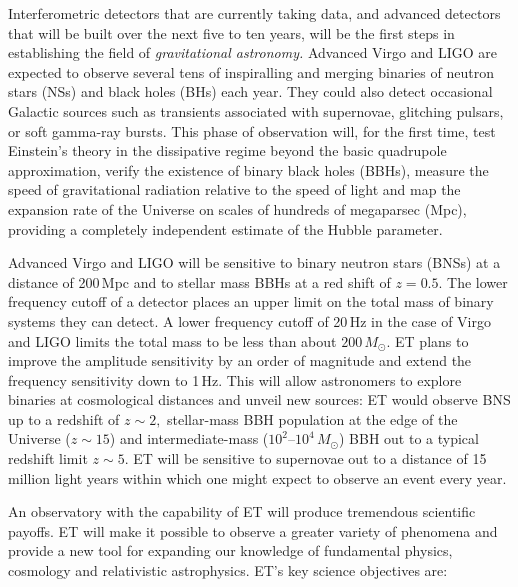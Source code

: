 Interferometric detectors that are currently
taking data, and advanced detectors that will be built over the next 
five to ten years, will be the first steps in establishing the field of 
{\em gravitational astronomy.} Advanced Virgo and LIGO are expected 
to observe several tens of inspiralling and merging binaries of 
neutron stars (NSs) and black holes (BHs) each year. They could also detect 
occasional Galactic sources such as transients associated with supernovae, 
glitching pulsars, or soft gamma-ray bursts.
This phase of observation will, for the first time, test 
Einstein's theory in the dissipative regime beyond the basic quadrupole 
approximation, verify the existence of binary black holes (BBHs), measure the 
speed of gravitational radiation relative to the speed of light and map 
the expansion rate of the Universe on scales of hundreds of megaparsec (Mpc), 
providing a completely independent estimate of the Hubble parameter. 

Advanced Virgo and LIGO will be sensitive to binary neutron stars (BNSs)
at a distance of 200\,Mpc and to stellar mass BBHs
at a red shift of $z=0.5.$ The lower frequency cutoff of a detector 
places an upper limit on the total mass of binary systems they can 
detect. A lower frequency cutoff of 20\,Hz in the case of Virgo and LIGO
limits the total mass to be less than about $200\,M_\odot.$ 
ET plans to improve the amplitude sensitivity by an order of magnitude 
and extend the frequency sensitivity down to 1\,Hz. This will allow
astronomers to explore binaries at cosmological distances and
unveil new sources: ET would observe BNS
up to a redshift of $z\sim 2,$ stellar-mass BBH
population at the edge of the Universe ($z\sim 15$) and 
intermediate-mass ($10^2$--$10^4\,M_\odot$) BBH out to a typical
redshift limit $z\sim 5$. ET will be sensitive to supernovae out to a
distance of 15 million light years within which one might expect to
observe an event every year. 

An observatory with the capability of ET will produce tremendous scientific 
payoffs.  ET will make it possible to observe a greater variety of 
phenomena and provide a new tool for expanding our knowledge of fundamental
physics, cosmology and relativistic astrophysics. ET's key science
objectives are:


